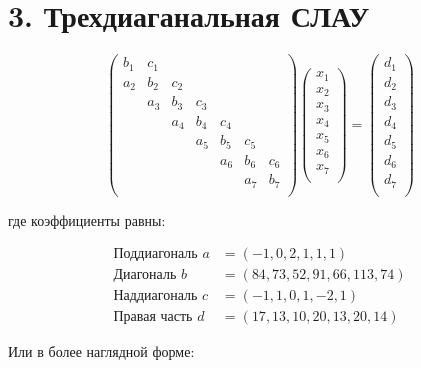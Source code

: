 \documentclass[12pt, a4paper]{article}
\begin{document}
\section*{3. Трехдиаганальная СЛАУ}
\begin{equation*}
\begin{pmatrix}
b_1 & c_1 &   &   &   &   &   \\
a_2 & b_2 & c_2 &   &   &   &   \\
  & a_3 & b_3 & c_3 &   &   &   \\
  &   & a_4 & b_4 & c_4 &   &   \\
  &   &   & a_5 & b_5 & c_5 &   \\
  &   &   &   & a_6 & b_6 & c_6 \\
  &   &   &   &   & a_7 & b_7 \\
\end{pmatrix}
\begin{pmatrix}
x_1 \\
x_2 \\
x_3 \\
x_4 \\
x_5 \\
x_6 \\
x_7 \\
\end{pmatrix}
=
\begin{pmatrix}
d_1 \\
d_2 \\
d_3 \\
d_4 \\
d_5 \\
d_6 \\
d_7 \\
\end{pmatrix}
\end{equation*}

где коэффициенты равны:

\begin{align*}
\text{Поддиагональ } a &= (-1, 0, 2, 1, 1, 1) \\
\text{Диагональ } b &= (84, 73, 52, 91, 66, 113, 74) \\
\text{Наддиагональ } c &= (-1, 1, 0, 1, -2, 1) \\
\text{Правая часть } d &= (17, 13, 10, 20, 13, 20, 14)
\end{align*}

Или в более наглядной форме:
\end{document}
